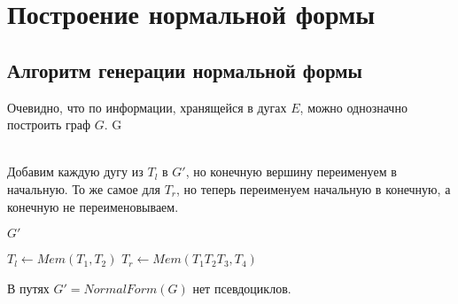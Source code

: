\section{Построение нормальной формы}
\label{normal_gen_algo}

\subsection*{Алгоритм генерации нормальной формы}
\begin{algorithmic}[1]
        \State Очевидно, что по информации, хранящейся в дугах $E$, можно однозначно построить граф $G$.
        \State \Return G
    \EndFunction
    
    \\
        \State Добавим каждую дугу из $T_l$ в $G'$, но конечную вершину переименуем в начальную.
        \State То же самое для $T_r$, но теперь переименуем начальную в конечную, а конечную не переименовываем.

        \State \Return $G'$
    \EndFunction
    \\

                \State $T_l \gets Mem(T_1, T_2)$
                \State $T_r \gets Mem(T_1 T_2 T_3, T_4)$
                \EndIf
            \EndFor
        \EndFor

        \State {}
    \EndFunction
\end{algorithmic}

\begin{theorem}
    В путях $G' = NormalForm(G)$ нет псевдоциклов.
\end{theorem}

